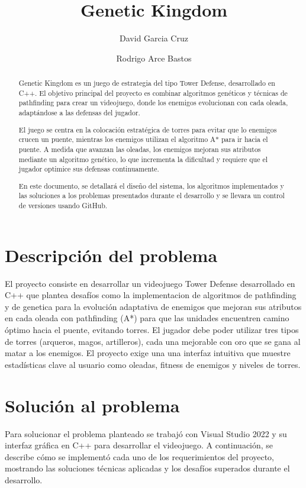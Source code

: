 \documentclass[a4paper,num-refs]{oup-contemporary}
\title{Genetic Kingdom}
\author[1,\authfn{1},\authfn{2}]{David Garcia Cruz}
\author[2,\authfn{1},\authfn{2}]{Rodrigo Arce Bastos}
\affil[1]{Tecnologico de Costa Rica}
\begin{document}
\begin{frontmatter}
\maketitle
\begin{abstract} 
Genetic Kingdom es un juego de estrategia del tipo Tower Defense, desarrollado en C++. El objetivo principal del proyecto es combinar algoritmos genéticos y técnicas de pathfinding para crear un videojuego, donde los enemigos evolucionan con cada oleada, adaptándose a las defensas del jugador.

El juego se centra en la colocación estratégica de torres para evitar que lo enemigos crucen un puente, mientras los enemigos utilizan el algoritmo A* para ir hacia el puente. A medida que avanzan las oleadas, los enemigos mejoran sus atributos mediante un algoritmo genético, lo que incrementa la dificultad y requiere que el jugador optimice sus defensas continuamente.

En este documento, se detallará el diseño del sistema, los algoritmos implementados y las soluciones a los problemas presentados durante el desarrollo y se llevara un control de versiones usando GitHub.
\end{abstract}
 
\end{frontmatter}

\tableofcontents

\section{Descripción del problema}
El proyecto consiste en desarrollar un videojuego Tower Defense desarrollado en C++ que plantea desafíos como la implementacion de algoritmos de pathfinding y de genetica para la evolución adaptativa de enemigos que mejoran sus atributos en cada oleada con pathfinding (A*) para que las unidades encuentren camino óptimo hacia el puente, evitando torres. El jugador debe poder utilizar tres tipos de torres (arqueros, magos, artilleros), cada una mejorable con oro que se gana al matar a los enemigos. El proyecto exige una  una interfaz intuitiva que muestre estadísticas clave al usuario como oleadas, fitness de enemigos y niveles de torres. 

\section{Solución al problema}
Para solucionar el problema planteado se trabajó con Visual Studio 2022 y su interfaz gráfica en C++ para desarrollar el videojuego. A continuación, se describe cómo se implementó cada uno de los requerimientos del proyecto, mostrando las soluciones técnicas aplicadas y los desafíos superados durante el desarrollo.
\end{document}
